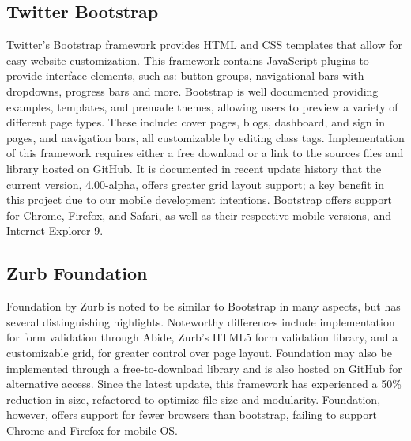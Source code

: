 \documentclass[letterpaper,10pt, draftclsnofoot,onecolumn]{IEEEtran}
\begin{document}
{{{{{{{{\subsection[Twitter Bootstrap]{\color{black}
Twitter Bootstrap}
{\color{black}\normalsize\noindent
{Twitter's Bootstrap framework provides HTML and CSS templates that allow for easy website customization. 
This framework contains JavaScript plugins to provide interface elements, such as: button groups, navigational bars with dropdowns, progress bars and more\cite{website1}.
Bootstrap is well documented providing examples, templates, and premade themes, allowing users to preview a variety of different page types. These include: cover pages, blogs, dashboard, and sign in pages, and navigation bars, all customizable by editing class tags. 
Implementation of this framework requires either a free download or a link to the sources files and library hosted on GitHub. 
It is documented in recent update history that the current version, 4.00-alpha, offers greater grid layout support; a key benefit in this project due to our mobile development intentions. 
Bootstrap offers support for Chrome, Firefox, and Safari, as well as their respective mobile versions, and Internet Explorer 9.
}

\subsection[Zurb Foundation]{\color{black}
Zurb Foundation}
{\color{black}\normalsize\noindent
{Foundation by Zurb is noted to be similar to Bootstrap in many aspects, but has several distinguishing highlights. 
Noteworthy differences include implementation for form validation through Abide, Zurb’s HTML5 form validation library, and a customizable grid, for greater control over page layout\cite{website1}.
Foundation may also be implemented through a free-to-download library and is also hosted on GitHub for alternative access. 
Since the latest update, this framework has experienced a 50\% reduction in size, refactored to optimize file size and modularity. 
Foundation, however, offers support for fewer browsers than bootstrap, failing to support Chrome and Firefox for mobile OS. }

}}}}}}}}}}
\end{document}
